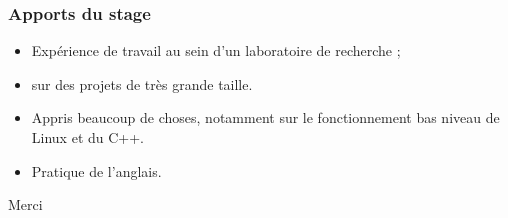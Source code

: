 \documentclass{beamer}
\begin{document}
\begin{frame}[fragile]
    \frametitle{Apports du stage}

    \begin{itemize}
        \item Expérience de travail au sein d'un laboratoire de recherche ;
        \item sur des projets de très grande taille.
        \item Appris beaucoup de choses, notamment sur le fonctionnement bas niveau de Linux et du C++.
        \item Pratique de l'anglais.
    \end{itemize}
\end{frame}

\begin{frame}[fragile]
    \begin{Huge}
        \centerline{Merci}
    \end{Huge}
\end{frame}


\appendix
\end{document}
